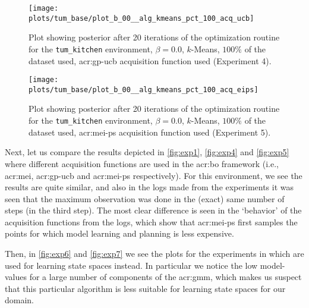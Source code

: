 	\begin{figure}
		\centering
		\texttt{[image: plots/tum\_base/plot\_b\_00\_\_alg\_kmeans\_pct\_100\_acq\_ucb]}
		\caption{Plot showing posterior after 20 iterations of the optimization routine for the \texttt{tum\_kitchen} environment, $\beta = 0.0$, $k$-Means, $100\%$ of the dataset used, \acrshort{acr:gp-ucb} acquisition function used (Experiment 4).}
		\label{fig:exp4}
	\end{figure}
	\begin{figure}
		\centering
		\texttt{[image: plots/tum\_base/plot\_b\_00\_\_alg\_kmeans\_pct\_100\_acq\_eips]}
		\caption{Plot showing posterior after 20 iterations of the optimization routine for the \texttt{tum\_kitchen} environment, $\beta = 0.0$, $k$-Means, $100\%$ of the dataset used, \acrshort{acr:mei-ps} acquisition function used (Experiment 5).}
		\label{fig:exp5}
	\end{figure}

Next, let us compare the results depicted in \autoref{fig:exp1}, \autoref{fig:exp4} and \autoref{fig:exp5} where different acquisition functions are used in the \acrshort{acr:bo} framework (i.e., \acrshort{acr:mei}, \acrshort{acr:gp-ucb} and \acrshort{acr:mei-ps} respectively).
For this environment, we see the results are quite similar, and also in the logs made from the experiments it was seen that the maximum observation was done in the (exact) same number of steps (in the third step).
The most clear difference is seen in the `behavior' of the acquisition functions from the logs, which show that \acrshort{acr:mei-ps} first samples the points for which model learning and planning is less expensive.

Then, in \autoref{fig:exp6} and \autoref{fig:exp7} we see the plots for the experiments in which  are used for learning state spaces instead.
In particular we notice the low model-values for a large number of components of the \acrshort{acr:gmm}, which makes us suspect that this particular algorithm is less suitable for learning state spaces for our domain.


